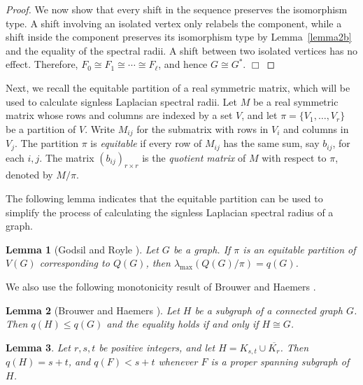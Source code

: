 \documentclass[11pt,a4paper]{article}
\newtheorem{lemma}{Lemma}[section]
\theoremstyle{definition}
\numberwithin{equation}{section}
\def\qed{\hfill$\Box$\vspace{12pt}}
\begin{document}
\begin{proof}
We now show that every shift in the sequence preserves the isomorphism type. A shift involving an isolated vertex only relabels the component, while a shift inside the component preserves its isomorphism type by Lemma~\ref{lemma2b} and the equality of the spectral radii. A shift between two isolated vertices has no effect. Therefore, \(F_0\cong F_1\cong\cdots\cong F_\ell\), and hence
\(G\cong G^*\). \qed
\end{proof}

Next, we recall the equitable partition of a real symmetric matrix, which will be used to calculate signless Laplacian spectral radii. Let $M$ be a real symmetric matrix whose rows and columns are indexed by a set $V$, and let $\pi=\{V_1,\ldots,V_r\}$ be a partition of $V$. Write $M_{ij}$ for the submatrix with rows in $V_i$ and columns in $V_j$. The partition $\pi$ is \emph{equitable} if every row of $M_{ij}$ has the same sum, say $b_{ij}$, for each $i,j$. The matrix $(b_{ij})_{r\times r}$ is the \emph{quotient matrix} of $M$ with respect to $\pi$, denoted by $M/\pi$.

The following lemma indicates that the equitable partition can be used to simplify the process of calculating the signless Laplacian spectral radius of a graph.

\begin{lemma}[Godsil and Royle \cite{Godsil}]\label{lemma5b}
Let $G$ be a graph. If $\pi$ is an equitable partition of $V(G)$ corresponding to $Q(G)$, then $\lambda_{\max}(Q(G)/\pi)=q(G)$.
\end{lemma}

We also use the following monotonicity result of Brouwer and Haemers \cite{Brouwer}.

\begin{lemma}[Brouwer and Haemers \cite{Brouwer}]\label{lemma6b}
Let $H$ be a subgraph of a connected graph $G$. Then $q(H)\le q(G)$ and the equality holds if and only if $H \cong G$.
\end{lemma}

\begin{lemma}\label{lemma7b}
Let $r,s,t$ be positive integers, and let $H=K_{s,t}\cup\overline{K_r}$. Then $q(H)=s+t$, and $q(F)<s+t$ whenever $F$ is a proper spanning subgraph of $H$.
\end{lemma}
\end{document}
